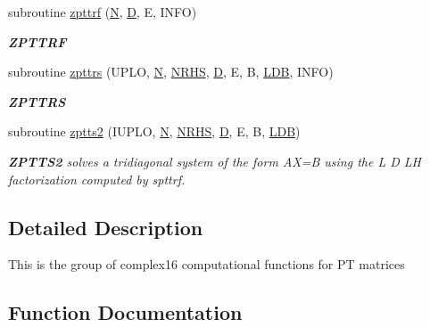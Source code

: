 \begin{DoxyCompactItemize}
subroutine \hyperlink{group__complex16PTcomputational_gac66038080132a6b116df577c91e3a39d}{zpttrf} (\hyperlink{polmisc_8c_a0240ac851181b84ac374872dc5434ee4}{N}, \hyperlink{odrpack_8h_a7dae6ea403d00f3687f24a874e67d139}{D}, E, I\+N\+F\+O)
\begin{DoxyCompactList}\small\item\em {\bfseries Z\+P\+T\+T\+R\+F} \end{DoxyCompactList}\item 
subroutine \hyperlink{group__complex16PTcomputational_ga7a91b8a69883b74c20c26aee3c537c55}{zpttrs} (U\+P\+L\+O, \hyperlink{polmisc_8c_a0240ac851181b84ac374872dc5434ee4}{N}, \hyperlink{example__user_8c_aa0138da002ce2a90360df2f521eb3198}{N\+R\+H\+S}, \hyperlink{odrpack_8h_a7dae6ea403d00f3687f24a874e67d139}{D}, E, B, \hyperlink{example__user_8c_a50e90a7104df172b5a89a06c47fcca04}{L\+D\+B}, I\+N\+F\+O)
\begin{DoxyCompactList}\small\item\em {\bfseries Z\+P\+T\+T\+R\+S} \end{DoxyCompactList}\item 
subroutine \hyperlink{group__complex16PTcomputational_ga216beeac0fe239f03d9b37f51e96d7c7}{zptts2} (I\+U\+P\+L\+O, \hyperlink{polmisc_8c_a0240ac851181b84ac374872dc5434ee4}{N}, \hyperlink{example__user_8c_aa0138da002ce2a90360df2f521eb3198}{N\+R\+H\+S}, \hyperlink{odrpack_8h_a7dae6ea403d00f3687f24a874e67d139}{D}, E, B, \hyperlink{example__user_8c_a50e90a7104df172b5a89a06c47fcca04}{L\+D\+B})
\begin{DoxyCompactList}\small\item\em {\bfseries Z\+P\+T\+T\+S2} solves a tridiagonal system of the form A\+X=B using the L D L\+H factorization computed by spttrf. \end{DoxyCompactList}\end{DoxyCompactItemize}


\subsection{Detailed Description}
This is the group of complex16 computational functions for P\+T matrices 

\subsection{Function Documentation}
\hypertarget{group__complex16PTcomputational_gae93ce2977fc454e3b4362e894d8b54df}{}
